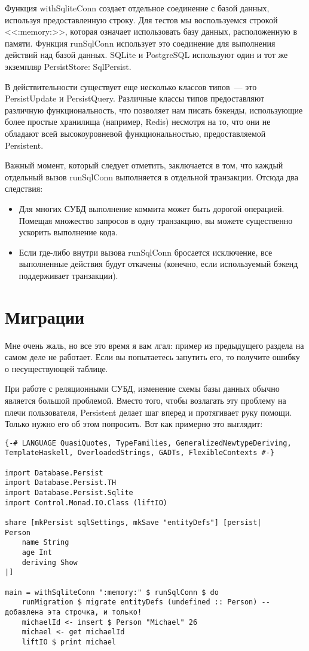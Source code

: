 Функция withSqliteConn создает отдельное соединение с базой данных, используя предоставленную строку. Для тестов мы воспользуемся строкой <<:memory:>>, которая означает использовать базу данных, расположенную в памяти. Функция runSqlConn использует это соединение для выполнения действий над базой данных. SQLite и PostgreSQL используют один и тот же экземпляр PersistStore: SqlPersist.

\begin{remark}
В действительности существует еще несколько классов типов~--- это PersistUpdate и PersistQuery. Различные классы типов предоставляют различную функциональность, что позволяет нам писать бэкенды, использующие более простые хранилища (например, Redis) несмотря на то, что они не обладают всей высокоуровневой функциональностью, предоставляемой Persistent. 
\end{remark}

Важный момент, который следует отметить, заключается в том, что каждый отдельный вызов runSqlConn выполняется в отдельной транзакции. Отсюда два следствия:

\begin{itemize}
  \item Для многих СУБД выполнение коммита может быть дорогой операцией. Помещая множество запросов в одну транзакцию, вы можете существенно ускорить выполнение кода.
  \item Если где-либо внутри вызова runSqlConn бросается исключение, все выполненные действия будут откачены (конечно, если используемый бэкенд поддерживает транзакции).
\end{itemize}

\section{Миграции} %

Мне очень жаль, но все это время я вам лгал: пример из предыдущего раздела на самом деле не работает. Если вы попытаетесь запутить его, то получите ошибку о несуществующей таблице.

При работе с реляционными СУБД, изменение схемы базы данных обычно является большой проблемой. Вместо того, чтобы возлагать эту проблему на плечи пользователя, Persistent делает шаг вперед и протягивает руку помощи. Только нужно его об этом попросить. Вот как примерно это выглядит:

\begin{lstlisting}
{-# LANGUAGE QuasiQuotes, TypeFamilies, GeneralizedNewtypeDeriving, TemplateHaskell, OverloadedStrings, GADTs, FlexibleContexts #-}

import Database.Persist
import Database.Persist.TH
import Database.Persist.Sqlite
import Control.Monad.IO.Class (liftIO)

share [mkPersist sqlSettings, mkSave "entityDefs"] [persist|
Person
    name String
    age Int
    deriving Show
|]

main = withSqliteConn ":memory:" $ runSqlConn $ do
    runMigration $ migrate entityDefs (undefined :: Person) -- добавлена эта строчка, и только!
    michaelId <- insert $ Person "Michael" 26
    michael <- get michaelId
    liftIO $ print michael
\end{lstlisting}%

